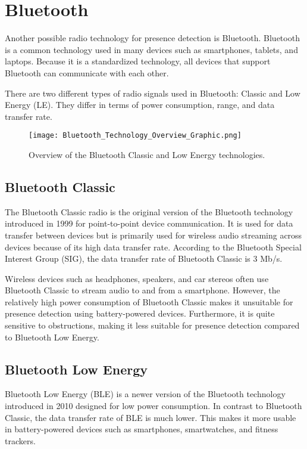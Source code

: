 \section{Bluetooth} \label{sec:bluetooth}
Another possible radio technology for presence detection is Bluetooth.
Bluetooth is a common technology used in many devices such as smartphones, tablets, and laptops.
Because it is a standardized technology, all devices that support Bluetooth can communicate with each other\cite{BluetoothOverview}.\cite{BluetoothSIG}

There are two different types of radio signals used in Bluetooth: Classic and Low Energy (LE).
They differ in terms of power consumption, range, and data transfer rate.\cite{BluetoothOverview}

\begin{figure}[h!]
  \centering
  \texttt{[image: Bluetooth\_Technology\_Overview\_Graphic.png]}
  \caption{Overview of the Bluetooth Classic and Low Energy technologies\cite{BluetoothOverview}.}
  \label{fig:classic_vs_LE}
\end{figure}

\subsection{Bluetooth Classic} \label{sec:bluetooth_classic}
The Bluetooth Classic radio is the original version of the Bluetooth technology introduced in 1999 for point-to-point device communication.
It is used for data transfer between devices but is primarily used for wireless audio streaming across devices because of its high data transfer rate.
According to the Bluetooth Special Interest Group (SIG), the data transfer rate of Bluetooth Classic is 3 Mb/s.\cite{BluetoothSIG}\cite{BluetoothOverview}

Wireless devices such as headphones, speakers, and car stereos often use Bluetooth Classic to stream audio to and from a smartphone.
However, the relatively high power consumption of Bluetooth Classic makes it unsuitable for presence detection using battery-powered devices.
Furthermore, it is quite sensitive to obstructions, making it less suitable for presence detection compared to Bluetooth Low Energy.\cite{BluetoothOverview}\cite{BluetoothAudioStreaming}

\subsection{Bluetooth Low Energy} \label{sec:bluetooth_low_energy}
Bluetooth Low Energy (BLE) is a newer version of the Bluetooth technology introduced in 2010 designed for low power consumption.
In contrast to Bluetooth Classic, the data transfer rate of BLE is much lower.
This makes it more usable in battery-powered devices such as smartphones, smartwatches, and fitness trackers.\cite{BLE_Regulatory_Aspects_Document}

